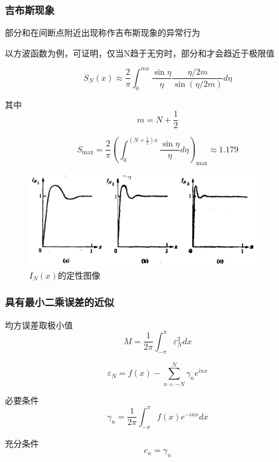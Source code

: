 \documentclass[10pt]{beamer}
\begin{document}
  \begin{frame}[allowframebreaks]
  \frametitle{吉布斯现象}
  
  部分和在间断点附近出现称作吉布斯现象的异常行为
  
  以方波函数为例，可证明，仅当N趋于无穷时，部分和才会趋近于极限值
  
  \begin{equation}
  S_{N}(x) \approx \frac{2}{\pi} \int_{0}^{m x} \frac{\sin \eta}{\eta} \frac{\eta / 2 m}{\sin (\eta / 2 m)} d \eta
  \end{equation}
  
  其中
  \begin{equation}
  m=N+\frac{1}{2}
  \end{equation}
  
  \begin{equation}
  S_{\max }=\frac{2}{\pi}\left(\int_{0}^{\left(N+\frac{1}{2}\right) x} \frac{\sin \eta}{\eta} d \eta\right)_{\max } \approx 1.179
  \end{equation}
  
  \begin{figure}[htp]
    \centering
    \includegraphics[width=10cm]{31.png}
    \caption{$I_N(x)$的定性图像}
    \label{fig:3.1}
  \end{figure}
  
\end{frame}
  
  \begin{frame}[allowframebreaks]
  \frametitle{具有最小二乘误差的近似}
  
  均方误差取极小值
  \begin{equation}
  M=\frac{1}{2 \pi} \int_{-\pi}^{\pi} \varepsilon_{N}^{2} d x
  \end{equation}
  
  \begin{equation}
  \varepsilon_{N}=f(x)-\sum_{n=-N}^{N} \gamma_{n} e^{i n x}
  \end{equation}
  
  必要条件
  \begin{equation}
  \gamma_{n}=\frac{1}{2 \pi} \int_{-\pi}^{\pi} f(x) e^{-i n x} d x
  \end{equation}
  
  充分条件
  \begin{equation}
  c_{n}=\gamma_{n}
  \end{equation}
  \end{frame}
  
\end{document}
